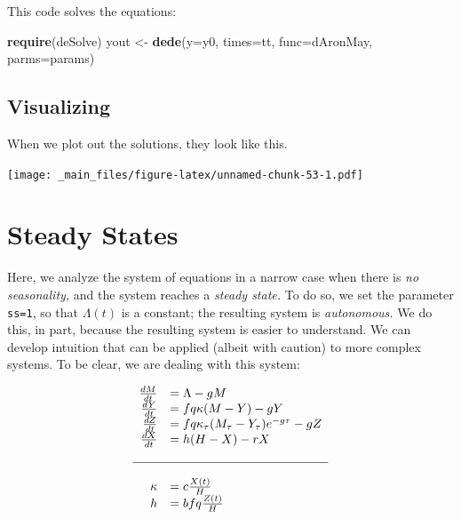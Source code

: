 \documentclass[
]{book}
\newenvironment{Shaded}{\begin{snugshade}}{\end{snugshade}}
\newcommand{\AttributeTok}[1]{\textcolor[rgb]{0.13,0.29,0.53}{#1}}
\newcommand{\FunctionTok}[1]{\textcolor[rgb]{0.13,0.29,0.53}{\textbf{#1}}}
\newcommand{\NormalTok}[1]{#1}
\newcommand{\OtherTok}[1]{\textcolor[rgb]{0.56,0.35,0.01}{#1}}
\begin{document}
This code solves the equations:

\begin{Shaded}
\begin{Highlighting}[]
\FunctionTok{require}\NormalTok{(deSolve)}
\NormalTok{yout }\OtherTok{\textless{}{-}} \FunctionTok{dede}\NormalTok{(}\AttributeTok{y=}\NormalTok{y0, }\AttributeTok{times=}\NormalTok{tt, }\AttributeTok{func=}\NormalTok{dAronMay, }\AttributeTok{parms=}\NormalTok{params) }
\end{Highlighting}
\end{Shaded}

\subsection{Visualizing}\label{visualizing}

When we plot out the solutions, they look like this.

\texttt{[image: \_main\_files/figure-latex/unnamed-chunk-53-1.pdf]}

\clearpage

\section{Steady States}\label{steady-states}

Here, we analyze the system of equations in a narrow case when there is \emph{no seasonality,} and the system reaches a \emph{steady state.} To do so, we set the parameter \texttt{ss=1}, so that \(\Lambda(t)\) is a constant; the resulting system is \emph{autonomous.} We do this, in part, because the resulting system is easier to understand. We can develop intuition that can be applied (albeit with caution) to more complex systems. To be clear, we are dealing with this system:

\begin{equation}
\begin{array}{rl}
\frac{dM}{dt} &= \Lambda - g M \\
\frac{dY}{dt} &= fq\kappa(M-Y) - g Y \\
\frac{dZ}{dt} &= fq\kappa_\tau(M_\tau-Y_\tau)e^{-g\tau} - g Z \\
\frac{dX}{dt} &= h (H-X) - rX  \\ \\ \hline \\ 
\kappa &= c \frac{X(t)}{H} \\
h &= b fq \frac{Z(t)}{H} \\
\end{array}
\end{equation}
\end{document}
